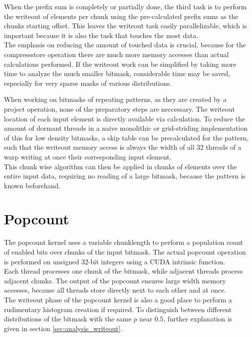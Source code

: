 \documentclass{tudscrreprt}
\begin{document}
		When the prefix sum is completely or partially done, the third task is to perform the writeout of elements per chunk using the pre-calculated prefix sums as the chunks starting offset. This leaves the writeout task easily parallelizable, which is important because it is also the task that touches the most data. \\
		
		The emphasis on reducing the amount of touched data is crucial, because for the compressstore operation there are much more memory accesses than actual calculations performed. If the writeout work can be simplified by taking more time to analyze the much smaller bitmask, considerable time may be saved, especially for very sparse masks of various distributions.
	
		When working on bitmasks of repeating patterns, as they are created by a project operation, none of the preparatory steps are neccessary. The writeout location of each input element is directly available via calculation. To reduce the amount of dormant threads in a naive monolithic or grid-striding implementation of this for low density bitmasks, a skip table can be precalculated for the pattern, such that the writeout memory access is always the width of all 32 threads of a warp writing at once their corresponding input element. \cite{cuda_gridstriding} \\
		This chunk wise algorithm can then be applied in chunks of elements over the entire input data, requiring no reading of a large bitmask, because the pattern is known beforehand. \\
	
		\section{Popcount}
			The popcount kernel uses a variable chunklength to perform a population count of enabled bits over chunks of the input bitmask. The actual popcount operation is performed on unsigned 32-bit integers using a CUDA intrinsic function. \\
			Each thread processes one chunk of the bitmask, while adjacent threads process adjacent chunks. The output of the popcount ensures large width memory accesses, because all threads store directly next to each other and at once. \\
			
			The writeout phase of the popcount kernel is also a good place to perform a rudimentary histogram creation if required. To distinguish between different distributions of the bitmask with the same $p$ near $0.5$, further explanation is given in section \ref{sec:analysis_writeout}. \\
		
\end{document}
